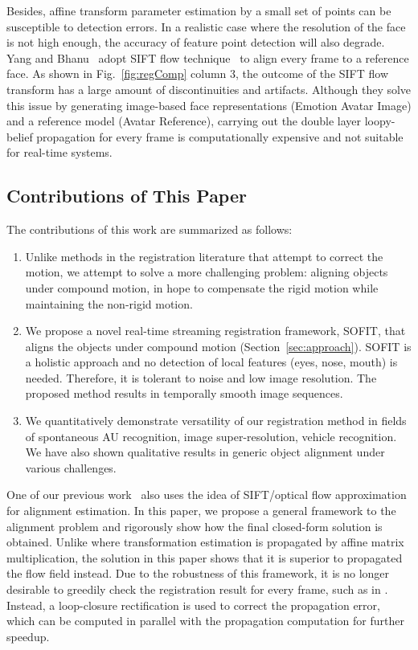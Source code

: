 \documentclass[10pt,journal]{IEEEtran}
\begin{document}
Besides, affine transform parameter estimation by a small set of points can be susceptible to detection errors. In a realistic case where the resolution of the face is not high enough, the accuracy of feature point detection will also degrade. Yang and Bhanu~\cite{Yang_SMCB12} adopt SIFT flow technique~\cite{Liu_PAMI11} to align every frame to a reference face. As shown in Fig.~\ref{fig:regComp} column 3, the outcome of the SIFT flow transform has a large amount of discontinuities and artifacts. Although they solve this issue by generating image-based face representations (Emotion Avatar Image) and a reference model (Avatar Reference), carrying out the double layer loopy-belief propagation for every frame is computationally expensive and not suitable for real-time systems.

\subsection{\label{sec:contribution}Contributions of This Paper}

The contributions of this work are summarized as follows:

\begin{enumerate}
\item Unlike methods in the registration literature that attempt to correct the motion, we attempt to solve a more challenging problem: aligning objects under compound motion, in hope to compensate the rigid motion while maintaining the non-rigid motion.
\item We propose a novel real-time streaming registration framework, SOFIT, that aligns the objects under compound motion (Section~\ref{sec:approach}). SOFIT is a holistic approach and no detection of local features (eyes, nose, mouth) is needed. Therefore, it is tolerant to noise and low image resolution. The proposed method results in temporally smooth image sequences.
\item We quantitatively demonstrate versatility of our registration method in fields of spontaneous AU recognition, image super-resolution, vehicle recognition. We have also shown qualitative results in generic object alignment under various challenges.
\end{enumerate}

One of our previous work~\cite{Yang_FG13} also uses the idea of SIFT/optical flow approximation for alignment estimation. In this paper, we propose a general framework to the alignment problem and rigorously show how the final closed-form solution is obtained. Unlike \cite{Yang_FG13} where transformation estimation is propagated by affine matrix multiplication, the solution in this paper shows that it is superior to propagated the flow field instead. Due to the robustness of this framework, it is no longer desirable to greedily check the registration result for every frame, such as in \cite{Yang_FG13}. Instead, a loop-closure rectification is used to correct the propagation error, which can be computed in parallel with the propagation computation for further speedup. 
\end{document}
